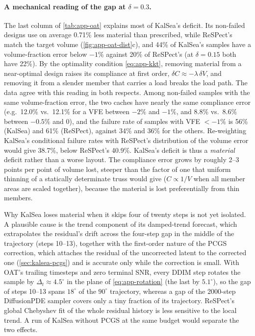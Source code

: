 \paragraph{A mechanical reading of the gap at $\delta=0.3$.} The last column of \cref{tab:app-oat} explains most of KalSea's deficit. Its non-failed designs use on average 0.71\% less material than prescribed, while ReSPect's match the target volume (\cref{fig:app-oat-dist}c), and 44\% of KalSea's samples have a volume-fraction error below $-1\%$ against 20\% of ReSPect's (at $\delta=0.15$ both have 22\%). By the optimality condition \cref{eq:app-kkt}, removing material from a near-optimal design raises its compliance at first order, $\delta C\approx-\lambda\,\delta V$, and removing it from a slender member that carries a load breaks the load path. The data agree with this reading in both respects. Among non-failed samples with the same volume-fraction error, the two caches have nearly the same compliance error (e.g.\ 12.0\% vs.\ 12.1\% for a VFE between $-2\%$ and $-1\%$, and 8.8\% vs.\ 8.6\% between $-0.5\%$ and $0$), and the failure rate of samples with VFE $<-1\%$ is 56\% (KalSea) and 61\% (ReSPect), against 34\% and 36\% for the others. Re-weighting KalSea's conditional failure rates with ReSPect's distribution of the volume error would give 38.7\%, below ReSPect's 40.9\%. KalSea's deficit is thus a \emph{material} deficit rather than a worse layout. The compliance error grows by roughly 2--3 points per point of volume lost, steeper than the factor of one that uniform thinning of a statically determinate truss would give ($C\propto1/V$ when all member areas are scaled together), because the material is lost preferentially from thin members.

Why KalSea loses material when it skips four of twenty steps is not yet isolated. A plausible cause is the trend component of its damped-trend forecast, which extrapolates the residual's drift across the four-step gap in the middle of the trajectory (steps 10--13), together with the first-order nature of the PCGS correction, which attaches the residual of the uncorrected latent to the corrected one (\cref{sec:kalsea-pcgs}) and is accurate only while the correction is small. With OAT's trailing timesteps and zero terminal SNR, every DDIM step rotates the sample by $\Delta_t\approx4.5^\circ$ in the plane of \cref{eq:app-rotation} (the last by $5.1^\circ$), so the gap of steps 10--13 spans $18^\circ$ of the $90^\circ$ trajectory, whereas a gap of the 2000-step DiffusionPDE sampler covers only a tiny fraction of its trajectory. ReSPect's global Chebyshev fit of the whole residual history is less sensitive to the local trend. A run of KalSea without PCGS at the same budget would separate the two effects.

